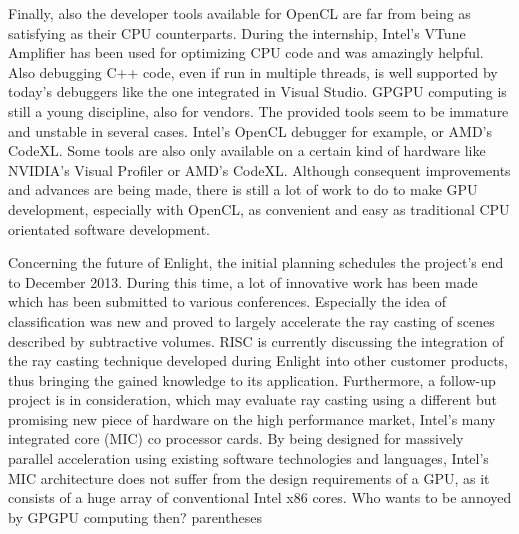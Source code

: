Finally, also the developer tools available for OpenCL are far from being as satisfying as their CPU counterparts. During the internship, Intel's VTune Amplifier has been used for optimizing CPU code and was amazingly helpful. Also debugging C++ code, even if run in multiple threads, is well supported by today's debuggers like the one integrated in Visual Studio. GPGPU computing is still a young discipline, also for vendors. The provided tools seem to be immature and unstable in several cases. Intel's OpenCL debugger for example, or AMD's CodeXL. Some tools are also only available on a certain kind of hardware like NVIDIA's Visual Profiler or AMD's CodeXL. Although consequent improvements and advances are being made, there is still a lot of work to do to make GPU development, especially with OpenCL, as convenient and easy as traditional CPU orientated software development.

Concerning the future of Enlight, the initial planning schedules the project's end to December 2013. During this time, a lot of innovative work has been made which has been submitted to various conferences. Especially the idea of classification was new and proved to largely accelerate the ray casting of scenes described by subtractive volumes. RISC is currently discussing the integration of the ray casting technique developed during Enlight into other customer products, thus bringing the gained knowledge to its application. Furthermore, a follow-up project is in consideration, which may evaluate ray casting using a different but promising new piece of hardware on the high performance market, Intel's many integrated core (MIC) co processor cards. By being designed for massively parallel acceleration using existing software technologies and languages, Intel's MIC architecture does not suffer from the design requirements of a GPU, as it consists of a huge array of conventional Intel x86 cores. Who wants to be annoyed by GPGPU computing then?
parentheses 